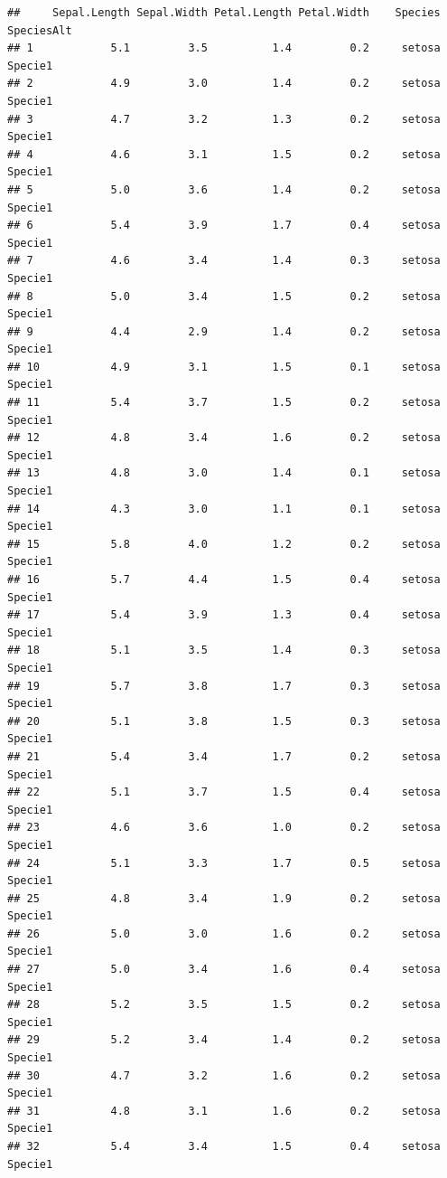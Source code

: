 \documentclass[
]{book}
\begin{document}
\begin{verbatim}
##     Sepal.Length Sepal.Width Petal.Length Petal.Width    Species SpeciesAlt
## 1            5.1         3.5          1.4         0.2     setosa    Specie1
## 2            4.9         3.0          1.4         0.2     setosa    Specie1
## 3            4.7         3.2          1.3         0.2     setosa    Specie1
## 4            4.6         3.1          1.5         0.2     setosa    Specie1
## 5            5.0         3.6          1.4         0.2     setosa    Specie1
## 6            5.4         3.9          1.7         0.4     setosa    Specie1
## 7            4.6         3.4          1.4         0.3     setosa    Specie1
## 8            5.0         3.4          1.5         0.2     setosa    Specie1
## 9            4.4         2.9          1.4         0.2     setosa    Specie1
## 10           4.9         3.1          1.5         0.1     setosa    Specie1
## 11           5.4         3.7          1.5         0.2     setosa    Specie1
## 12           4.8         3.4          1.6         0.2     setosa    Specie1
## 13           4.8         3.0          1.4         0.1     setosa    Specie1
## 14           4.3         3.0          1.1         0.1     setosa    Specie1
## 15           5.8         4.0          1.2         0.2     setosa    Specie1
## 16           5.7         4.4          1.5         0.4     setosa    Specie1
## 17           5.4         3.9          1.3         0.4     setosa    Specie1
## 18           5.1         3.5          1.4         0.3     setosa    Specie1
## 19           5.7         3.8          1.7         0.3     setosa    Specie1
## 20           5.1         3.8          1.5         0.3     setosa    Specie1
## 21           5.4         3.4          1.7         0.2     setosa    Specie1
## 22           5.1         3.7          1.5         0.4     setosa    Specie1
## 23           4.6         3.6          1.0         0.2     setosa    Specie1
## 24           5.1         3.3          1.7         0.5     setosa    Specie1
## 25           4.8         3.4          1.9         0.2     setosa    Specie1
## 26           5.0         3.0          1.6         0.2     setosa    Specie1
## 27           5.0         3.4          1.6         0.4     setosa    Specie1
## 28           5.2         3.5          1.5         0.2     setosa    Specie1
## 29           5.2         3.4          1.4         0.2     setosa    Specie1
## 30           4.7         3.2          1.6         0.2     setosa    Specie1
## 31           4.8         3.1          1.6         0.2     setosa    Specie1
## 32           5.4         3.4          1.5         0.4     setosa    Specie1

\end{verbatim}
\end{document}
